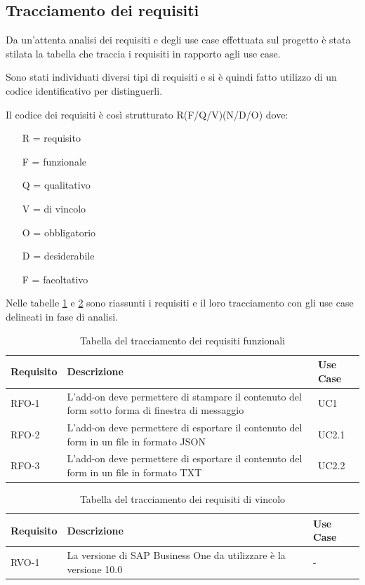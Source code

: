 \newpage

\subsection{Tracciamento dei requisiti}
Da un'attenta analisi dei requisiti e degli use case effettuata sul progetto è stata stilata la tabella che traccia i requisiti in rapporto agli use case.

Sono stati individuati diversi tipi di requisiti e si è quindi fatto utilizzo di un codice identificativo per distinguerli.

Il codice dei requisiti è così strutturato R(F/Q/V)(N/D/O) dove:
\begin{enumerate}
	\item[R =] requisito
	\item[F =] funzionale
	\item[Q =] qualitativo
	\item[V =] di vincolo
	\item[O =] obbligatorio
	\item[D =] desiderabile
	\item[F =] facoltativo
\end{enumerate}
Nelle tabelle \ref{tab:requisiti-funzionali} e \ref{tab:requisiti-vincolo} sono riassunti i requisiti e il loro tracciamento con gli use case delineati in fase di analisi.


\begin{table}[!h]%
	\begin{tabularx}{\textwidth}{lXl}
		\hline\hline
		\textbf{Requisito} & \textbf{Descrizione} & \textbf{Use Case}\\
		\hline
		RFO-1     & L'add-on deve permettere di stampare il contenuto del form sotto forma di finestra di messaggio & UC1 \\
		RFO-2     & L'add-on deve permettere di esportare il contenuto del form in un file in formato JSON & UC2.1\\
		RFO-3     & L'add-on deve permettere di esportare il contenuto del form in un file in formato TXT & UC2.2\\
		\hline
	\end{tabularx}
	\caption{Tabella del tracciamento dei requisiti funzionali}
	\label{tab:requisiti-funzionali}
\end{table}%

\begin{table}[!h]%
	\begin{tabularx}{\textwidth}{lXl}
		\hline\hline
		\textbf{Requisito} & \textbf{Descrizione} & \textbf{Use Case}\\
		\hline
		RVO-1    & La versione di SAP Business One da utilizzare è la versione 10.0 & - \\
		\hline
	\end{tabularx}
	\caption{Tabella del tracciamento dei requisiti di vincolo}
	\label{tab:requisiti-vincolo}
\end{table}%

